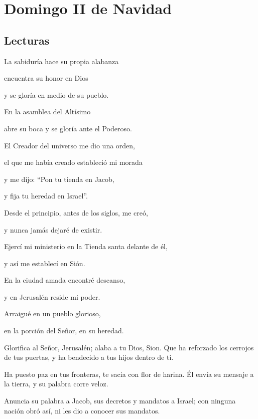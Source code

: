 \chapter{Domingo II de Navidad}

	\section{Lecturas}

		
		 
		
		
		\begin{scripture}
			La sabiduría hace su propia alabanza
			
			encuentra su honor en Dios
			
			y se gloría en medio de su pueblo.
			
			En la asamblea del Altísimo
			
			abre su boca y se gloría ante el Poderoso.
			
			El Creador del universo me dio una orden,
			
			el que me había creado estableció mi morada
			
			y me dijo: ``Pon tu tienda en Jacob,
			
			y fija tu heredad en Israel''.
			
			Desde el principio, antes de los siglos, me creó,
			
			y nunca jamás dejaré de existir.
			
			Ejercí mi ministerio en la Tienda santa delante de él,
			
			y así me establecí en Sión.
			
			En la ciudad amada encontré descanso,
			
			y en Jerusalén reside mi poder.
			
			Arraigué en un pueblo glorioso,
			
			en la porción del Señor, en su heredad.
		\end{scripture}
	
		
		 
		
		
		\begin{psbody}
			Glorifica al Señor, Jerusalén;
			alaba a tu Dios, Sion.
			Que ha reforzado los cerrojos de tus puertas,
			y ha bendecido a tus hijos dentro de ti.
			
			Ha puesto paz en tus fronteras,
			te sacia con flor de harina.
			Él envía su mensaje a la tierra,
			y su palabra corre veloz.
			
			Anuncia su palabra a Jacob,
			sus decretos y mandatos a Israel;
			con ninguna nación obró así,
			ni les dio a conocer sus mandatos.
		\end{psbody}
	
